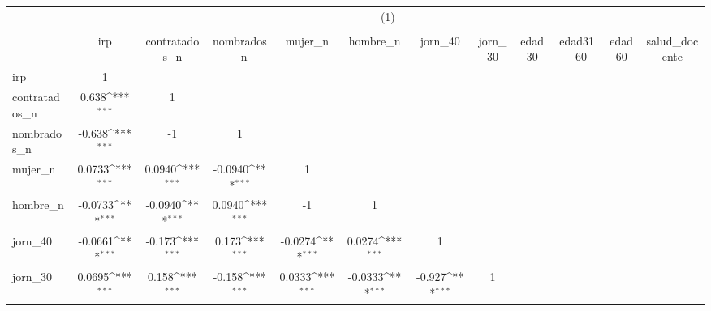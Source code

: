 {
\def\sym#1{\ifmmode^{#1}\else\(^{#1}\)\fi}
\begin{tabular}{l*{11}{c}}
\hline\hline
          &\multicolumn{11}{c}{(1)}                                                                                                                                                                                        \\
          &\multicolumn{11}{c}{}                                                                                                                                                                                           \\
          &      irp         &contratados\_n         &nombrados\_n         &  mujer\_n         & hombre\_n         &  jorn\_40         &  jorn\_30         &   edad30         &edad31\_60         &   edad60         &salud\_docente         \\
\hline
irp       &        1         &                  &                  &                  &                  &                  &                  &                  &                  &                  &                  \\
contratados\_n&    0.638\sym{***}&        1         &                  &                  &                  &                  &                  &                  &                  &                  &                  \\
nombrados\_n&   -0.638\sym{***}&       -1         &        1         &                  &                  &                  &                  &                  &                  &                  &                  \\
mujer\_n   &   0.0733\sym{***}&   0.0940\sym{***}&  -0.0940\sym{***}&        1         &                  &                  &                  &                  &                  &                  &                  \\
hombre\_n  &  -0.0733\sym{***}&  -0.0940\sym{***}&   0.0940\sym{***}&       -1         &        1         &                  &                  &                  &                  &                  &                  \\
jorn\_40   &  -0.0661\sym{***}&   -0.173\sym{***}&    0.173\sym{***}&  -0.0274\sym{***}&   0.0274\sym{***}&        1         &                  &                  &                  &                  &                  \\
jorn\_30   &   0.0695\sym{***}&    0.158\sym{***}&   -0.158\sym{***}&   0.0333\sym{***}&  -0.0333\sym{***}&   -0.927\sym{***}&        1         &                  &                  &                  &                  \\

\end{tabular}}
